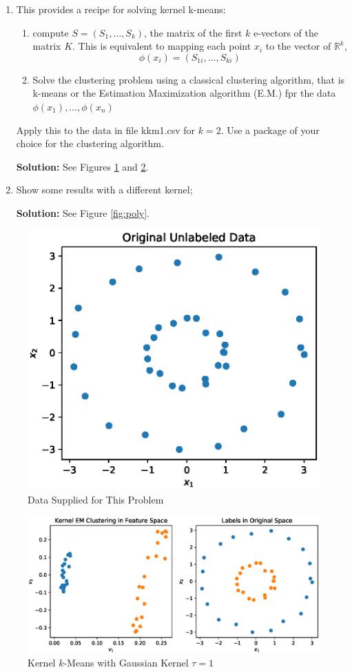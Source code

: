 \documentclass{article}[12pt]
\begin{document}
\begin{enumerate}
 \item This provides a recipe for solving kernel k-means: 
 \begin{enumerate}
 \item compute $S=(S_1,\ldots,S_k)$, the matrix of the first $k$ e-vectors of the matrix $K$. This is equivalent to mapping each point $x_i$ to the vector of $\mathbb{R}^k$, 
 \begin{equation}
 \phi(x_i)=(S_{1i},\ldots,S_{ki})
 \end{equation}
 \item Solve the clustering problem using a classical clustering algorithm, that is k-means or the Estimation Maximization algorithm (E.M.) fpr the data $\phi(x_1),\ldots,\phi(x_n)$
 \end{enumerate}
 Apply this to the data in file \mbox{kkm1.csv} for $k=2$. Use a package of your choice for the clustering algorithm. 
 
 \textbf{Solution:} See Figures \ref{fig:orig} and \ref{fig:gauss}.

 \item Show some results with a different kernel;

	 \textbf{Solution:} See Figure \ref{fig:poly}.
\end{enumerate}  

\begin{figure}
	\centering
	\includegraphics[width=0.4\linewidth]{img/original_data.eps}
	\caption{Data Supplied for This Problem}%
	\label{fig:orig}
\end{figure}

\begin{figure}
	\centering
	\includegraphics[width=0.8\linewidth]{./img/gaussian_1.eps}
	\caption{Kernel $k$-Means with Gaussian Kernel $\tau=1$}%
	\label{fig:gauss}
\end{figure}
\end{document}
